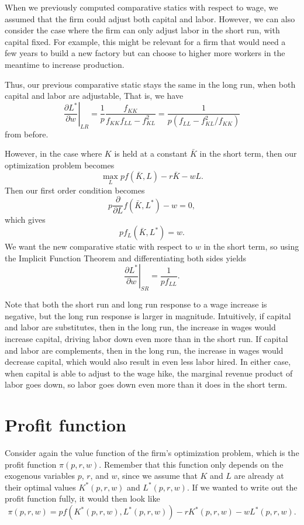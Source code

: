 When we previously computed comparative statics with respect to wage, we assumed that the firm could adjust both capital and labor. However, we can also consider the case where the firm can only adjust labor in the short run, with capital fixed. For example, this might be relevant for a firm that would need a few years to build a new factory but can choose to higher more workers in the meantime to increase production.

Thus, our previous comparative static stays the same in the long run, when both capital and labor are adjustable, That is, we have 
$$\left.\frac{\partial L^{*}}{\partial w}\right|_{L R}=\frac{1}{p} \frac{f_{K K}}{f_{K K} f_{L L}-f_{K L}^{2}}=\frac{1}{p\left(f_{L L}-f_{K L}^{2} / f_{K K}\right)}$$
from before.

However, in the case where $K$ is held at a constant $\bar{K}$ in the short term, then our optimization problem becomes
$$\max_L pf(\bar{K}, L) - r\bar{K} - wL.$$
Then our first order condition becomes
$$p\frac{\partial}{\partial L} f(\bar{K}, L^*) - w = 0,$$
which gives
$$pf_L(\bar{K}, L^*) = w.$$
We want the new comparative static with respect to $w$ in the short term, so using the Implicit Function Theorem and differentiating both sides yields
$$\left.\frac{\partial L^{*}}{\partial w}\right|_{S R}=\frac{1}{p f_{L L}}.$$

Note that both the short run and long run response to a wage increase is negative, but the long run response is larger in magnitude. Intuitively, if capital and labor are substitutes, then in the long run, the increase in wages would increase capital, driving labor down even more than in the short run. If capital and labor are complements, then in the long run, the increase in wages would decrease capital, which would also result in even less labor hired. In either case, when capital is able to adjust to the wage hike, the marginal revenue product of labor goes down, so labor goes down even more than it does in the short term.

\section{Profit function}

Consider again the value function of the firm's optimization problem, which is the profit function $\pi(p, r, w)$. Remember that this function only depends on the exogenous variables $p$, $r$, and $w$, since we assume that $K$ and $L$ are already at their optimal values $K^*(p, r, w)$ and $L^*(p, r, w)$. If we wanted to write out the profit function fully, it would then look like
$$\pi(p, r, w) = pf(K^*(p, r, w), L^*(p, r, w)) - rK^*(p, r, w) - wL^*(p, r, w).$$

